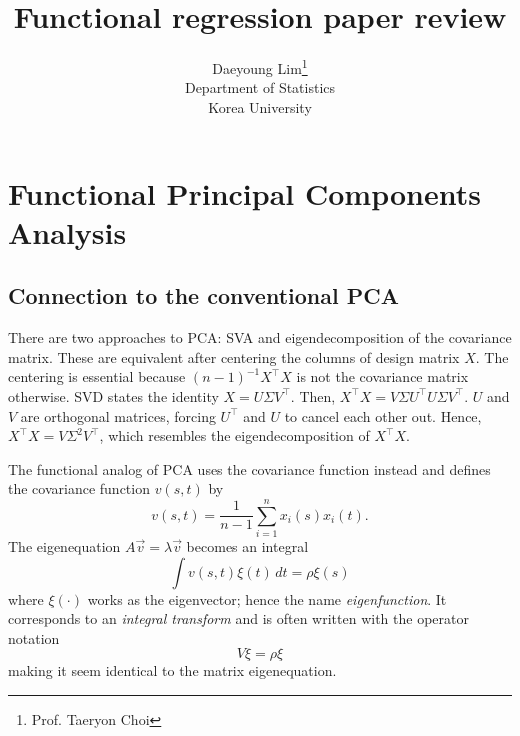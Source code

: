 \documentclass[11pt]{article}
\begin{document}
\nocite{*}

\title{Functional regression paper review}

\author{Daeyoung Lim\thanks{Prof. Taeryon Choi} \\
Department of Statistics \\
Korea University}

\maketitle
\section{Functional Principal Components Analysis}
\subsection{Connection to the conventional PCA}
There are two approaches to PCA: SVA and eigendecomposition of the covariance matrix. These are equivalent after centering the columns of design matrix $X$. The centering is essential because $\left(n-1\right)^{-1}X^{\top}X$ is not the covariance matrix otherwise. SVD states the identity $X = U\Sigma V^{\top}$. Then, $X^{\top}X = V\Sigma U^{\top}U \Sigma V^{\top}$. $U$ and $V$ are orthogonal matrices, forcing $U^{\top}$ and $U$ to cancel each other out. Hence, $X^{\top}X=V\Sigma^{2} V^{\top}$, which resembles the eigendecomposition of $X^{\top}X$. \par
The functional analog of PCA uses the covariance function instead and defines the covariance function $v\left(s,t\right)$ by
\begin{equation}
  v\left(s,t\right) = \frac{1}{n-1}\sum_{i=1}^{n}x_{i}\left(s\right)x_{i}\left(t\right).
\end{equation}
The eigenequation $A\vec{v}=\lambda\vec{v}$ becomes an integral
\begin{equation}\label{feigenequation}
  \int v\left(s,t\right)\xi\left(t\right)\,dt = \rho \xi\left(s\right)
\end{equation}
where $\xi\left(\cdot\right)$ works as the eigenvector; hence the name \emph{eigenfunction}. It corresponds to an \emph{integral transform} and is often written with the operator notation
\begin{equation}
  V\xi = \rho \xi
\end{equation}
making it seem identical to the matrix eigenequation.
\end{document}
